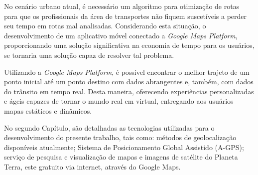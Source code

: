
No cenário urbano atual, é necessário um algoritmo para otimização de rotas para que os profissionais da área de transportes não fiquem suscetíveis a perder seu tempo em rotas mal analisadas. Considerando esta situação, o desenvolvimento de um aplicativo móvel conectado a \textit{Google Maps Platform}, proporcionando uma solução significativa na economia de tempo para os usuários, se tornaria uma solução capaz de resolver tal problema.


Utilizando a \textit{Google Maps Platform}, é possível encontrar o melhor trajeto de um ponto inicial até um ponto destino com dados abrangentes e, também, com dados do trânsito em tempo real. Desta maneira, oferecendo experiências personalizadas e ágeis capazes de tornar o mundo real em virtual, entregando aos usuários mapas estáticos e dinâmicos. 


No segundo Capítulo, são detalhadas as tecnologias utilizadas para o desenvolvimento do presente trabalho, tais como: métodos de geolocalização disponíveis atualmente; Sistema de Posicionamento Global Assistido (A-GPS); serviço de pesquisa e visualização de mapas e imagens de satélite do Planeta Terra, este gratuito via internet, através do Google Maps.

